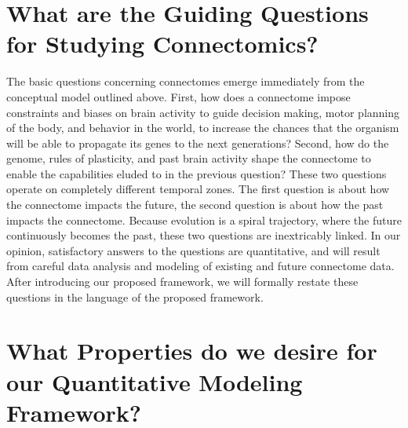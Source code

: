 \documentclass[11pt]{article}
\begin{document}
\section{What are the Guiding Questions for Studying Connectomics?}



The basic questions concerning connectomes emerge immediately from the conceptual model outlined above.  First, how does a connectome impose constraints and biases on brain activity to guide decision making, motor planning of the body, and behavior in the world, to increase the chances that the organism will be able to propagate its genes to the next generations?  Second, how do the genome, rules of plasticity, and past brain activity shape the connectome to enable the capabilities eluded to in the previous question?  These two questions operate on completely different temporal zones. The first question is about how the connectome impacts the future, the second question is about how the past impacts the connectome.  Because evolution is a spiral trajectory, where the future continuously becomes the past, these two questions are inextricably linked.  In our opinion, satisfactory answers to the questions are quantitative, and will result from careful data analysis and modeling of existing and future connectome data. After introducing our proposed framework, we will formally restate these questions in the language of the proposed framework.



\section{What Properties do we desire for our Quantitative Modeling Framework?}
\end{document}
